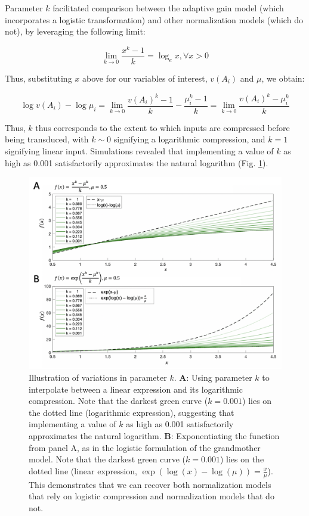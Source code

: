 \documentclass[a4paper, nobind]{templates/ociamthesis}
\begin{document}
Parameter \(k\) facilitated comparison between the adaptive gain model (which incorporates a logistic transformation) and other normalization models (which do not), by leveraging the following limit:

\begin{equation}
\lim_{k \to 0} \frac{x^k-1}{k} = \log_e x, \forall x>0 
\label{eq:decoy-limit}
\end{equation}

Thus, substituting \(x\) above for our variables of interest, \(v(A_i)\) and \(\mu\), we obtain:

\begin{equation}
\log v(A_i) - \log \mu_i = \lim_{k \to 0} \frac{v(A_i)^k-1}{k}-\frac{\mu_i^k-1}{k} = \lim_{k \to 0} \frac{v(A_i)^k - \mu_i^k}{k}
\label{eq:decoy-limit-eq}
\end{equation}

Thus, \(k\) thus corresponds to the extent to which inputs are compressed before being transduced, with \(k\sim 0\) signifying a logarithmic compression, and \(k=1\) signifying linear input. Simulations revealed that implementing a value of \(k\) as high as 0.001 satisfactorily approximates the natural logarithm (Fig. \ref{fig:decoy-log}).

\begin{figure}

{\centering \includegraphics[width=1\linewidth]{figures/decoy-log} 

}

\caption[Model compression approximation]{Illustration of variations in parameter $k$. $\textbf{A:}$ Using parameter $k$ to interpolate between a linear expression and its logarithmic compression. Note that the darkest green curve ($k=0.001$) lies on the dotted line (logarithmic expression), suggesting that implementing a value of $k$ as high as 0.001 satisfactorily approximates the natural logarithm. $\textbf{B:}$ Exponentiating the function from panel A,  as in the logistic formulation of the grandmother model. Note that the darkest green curve ($k=0.001$) lies on the dotted line (linear expression, $\exp(\log(x)-\log(\mu))=\frac{x}{\mu}$). This demonstrates that we can recover both normalization models that rely on logistic compression and normalization models that do not.}\label{fig:decoy-log}
\end{figure}
\end{document}
